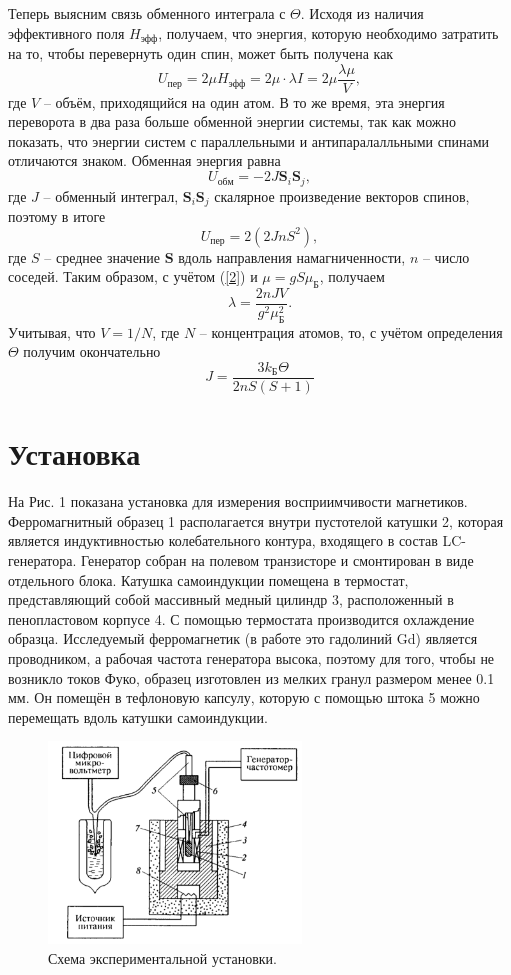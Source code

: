 \documentclass[a4paper,12pt]{article}
\theoremstyle{definition}
\begin{document}
Теперь выясним связь обменного интеграла с $\Theta$. Исходя из наличия эффективного поля $H_{\text{эфф}}$, получаем, что энергия, которую необходимо затратить на то, чтобы перевернуть один спин, может быть получена как 
\begin{equation}\label{2}
U_{\text{пер}} = 2\mu H_{\text{эфф}} = 2 \mu \cdot \lambda I = 2\mu \dfrac{\lambda \mu}{V},
\end{equation}
где $V$ -- объём, приходящийся на один атом. В то же время, эта энергия переворота в два раза больше обменной энергии системы, так как можно показать, что энергии систем с параллельными и антипаралалльными спинами отличаются знаком. Обменная энергия равна 
\[
U_{\text{обм}} = -2J \mathbf{S}_i \mathbf{S}_j,
\]
 где $J$ -- обменный интеграл, $\mathbf{S}_i \mathbf{S}_j$ скалярное произведение векторов спинов, поэтому в итоге
\[
U_{\text{пер}} = 2 (2JnS^2),
\]
где $S$ -- среднее значение $\mathbf{S}$ вдоль направления намагниченности, $n$ -- число соседей. Таким образом, с учётом (\ref{2}) и $\mu = gS\mu_\text{Б}$, получаем
\[
\lambda = \dfrac{2nJV}{g^2\mu^2_\text{Б}}.
\]
Учитывая, что $V = 1/N$, где $N$ -- концентрация атомов, то, с учётом определения $\Theta$ получим окончательно
\begin{equation}\label{4}
\boxed{J = \dfrac{3k_\text{Б}\Theta}{2nS(S+1)}}
\end{equation}

\section*{Установка}
На Рис. 1 показана установка для измерения восприимчивости магнетиков. Ферромагнитный образец 1 располагается внутри пустотелой катушки 2, которая является индуктивностью колебательного контура, входящего в состав LC-генератора. Генератор собран на полевом транзисторе и смонтирован в виде отдельного блока. Катушка самоиндукции помещена в термостат, представляющий собой массивный медный цилиндр 3, расположенный в пенопластовом корпусе 4. С помощью термостата производится охлаждение образца. Исследуемый ферромагнетик (в работе это гадолиний Gd) является проводником, а рабочая частота генератора высока, поэтому для того, чтобы не возникло токов Фуко, образец изготовлен из мелких гранул размером менее 0.1 мм. Он помещён в тефлоновую капсулу, которую с помощью штока 5 можно перемещать вдоль катушки самоиндукции.\\
\begin{figure}[h]
\includegraphics[width = 0.6\textwidth]{1.png}
\centering
\caption{Схема экспериментальной установки.}
\end{figure}
\end{document}
